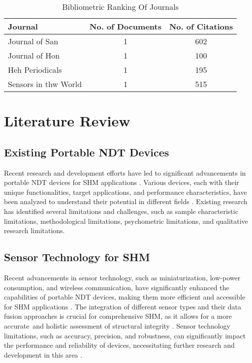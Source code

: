 \documentclass[journal, a4paper]{IEEEtran}
\begin{document}
\begin{table}[htbp]

  \centering
  \caption{Bibliometric Ranking Of Journals}
  \label{tbl:bibliometricRanking}
  \begin{tabular}{lcc}

      \toprule
      \textbf{Journal} & \textbf{No. of Documents} & \textbf{No. of Citations} \\
      \midrule
      Journal of San                   & 1     & 602   \\
      Journal of Hon                   & 1     & 100   \\
      Heh Periodicals                  & 1     & 195   \\
      Sensors in thw World             & 1     & 515   \\
      \bottomrule
  \end{tabular}
\end{table}


\section{Literature Review}

\subsection{Existing Portable NDT Devices}
Recent research and development efforts have led to significant advancements in portable NDT devices
for SHM applications \cite{Vijayan2023} \cite{Parsy2018} \cite{Hassani2023}.
Various devices, each with their unique functionalities, target applications, and performance characteristics,
have been analyzed to understand their potential in different fields \cite{Khanna2020} \cite{Baig2021} \cite{Corzo2020}.
Existing research has identified several limitations and challenges, such as sample characteristic limitations,
methodological limitations, psychometric limitations, and qualitative research limitations.


\subsection{Sensor Technology for SHM}
Recent advancements in sensor technology, such as miniaturization, low-power consumption, and wireless communication,
have significantly enhanced the capabilities of portable NDT devices,
making them more efficient and accessible for SHM applications \cite{Hassani2023} \cite{Valeske2020}.
The integration of different sensor types and their data fusion approaches is crucial
for comprehensive SHM, as it allows for a more accurate\
and holistic assessment of structural integrity \cite{Broer2022} \cite{Azimi2020}.
Sensor technology limitations, such as accuracy, precision, and robustness,
can significantly impact the performance and reliability of devices,
necessitating further research and development in this area \cite{Varshney2021} \cite{Moore2020}.
\end{document}
